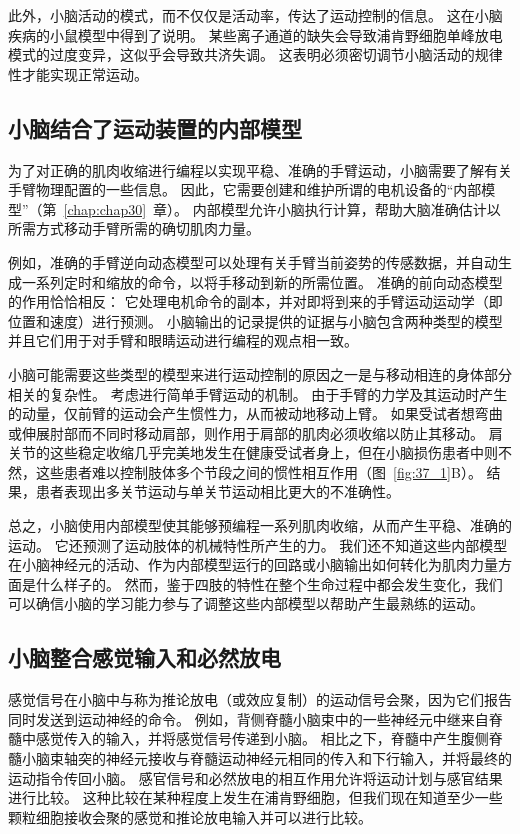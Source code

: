 此外，小脑活动的模式，而不仅仅是活动率，传达了运动控制的信息。
这在小脑疾病的小鼠模型中得到了说明。
某些离子通道的缺失会导致浦肯野细胞单峰放电模式的过度变异，这似乎会导致共济失调。
这表明必须密切调节小脑活动的规律性才能实现正常运动。



\subsection{小脑结合了运动装置的内部模型}

为了对正确的肌肉收缩进行编程以实现平稳、准确的手臂运动，小脑需要了解有关手臂物理配置的一些信息。
因此，它需要创建和维护所谓的电机设备的“内部模型”（第~\ref{chap:chap30}~章）。
内部模型允许小脑执行计算，帮助大脑准确估计以所需方式移动手臂所需的确切肌肉力量。


例如，准确的手臂逆向动态模型可以处理有关手臂当前姿势的传感数据，并自动生成一系列定时和缩放的命令，以将手移动到新的所需位置。
准确的前向动态模型的作用恰恰相反：
它处理电机命令的副本，并对即将到来的手臂运动运动学（即位置和速度）进行预测。 小脑输出的记录提供的证据与小脑包含两种类型的模型并且它们用于对手臂和眼睛运动进行编程的观点相一致。


小脑可能需要这些类型的模型来进行运动控制的原因之一是与移动相连的身体部分相关的复杂性。
考虑进行简单手臂运动的机制。
由于手臂的力学及其运动时产生的动量，仅前臂的运动会产生惯性力，从而被动地移动上臂。
如果受试者想弯曲或伸展肘部而不同时移动肩部，则作用于肩部的肌肉必须收缩以防止其移动。
肩关节的这些稳定收缩几乎完美地发生在健康受试者身上，但在小脑损伤患者中则不然，这些患者难以控制肢体多个节段之间的惯性相互作用（图~\ref{fig:37_1}B）。
结果，患者表现出多关节运动与单关节运动相比更大的不准确性。


总之，小脑使用内部模型使其能够预编程一系列肌肉收缩，从而产生平稳、准确的运动。
它还预测了运动肢体的机械特性所产生的力。 我们还不知道这些内部模型在小脑神经元的活动、作为内部模型运行的回路或小脑输出如何转化为肌肉力量方面是什么样子的。
然而，鉴于四肢的特性在整个生命过程中都会发生变化，我们可以确信小脑的学习能力参与了调整这些内部模型以帮助产生最熟练的运动。



\subsection{小脑整合感觉输入和必然放电}

感觉信号在小脑中与称为推论放电（或效应复制）的运动信号会聚，因为它们报告同时发送到运动神经的命令。
例如，背侧脊髓小脑束中的一些神经元中继来自脊髓中感觉传入的输入，并将感觉信号传递到小脑。
相比之下，脊髓中产生腹侧脊髓小脑束轴突的神经元接收与脊髓运动神经元相同的传入和下行输入，并将最终的运动指令传回小脑。
感官信号和必然放电的相互作用允许将运动计划与感官结果进行比较。
这种比较在某种程度上发生在浦肯野细胞，但我们现在知道至少一些颗粒细胞接收会聚的感觉和推论放电输入并可以进行比较。


